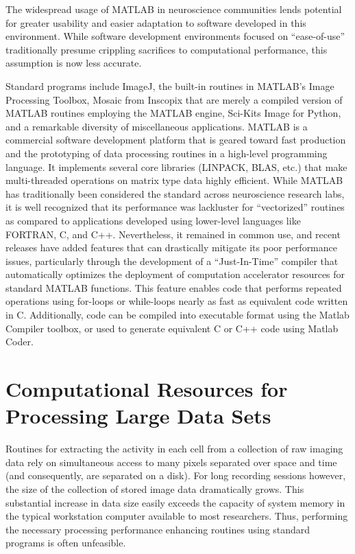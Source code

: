 \documentclass[
  12pt,
  lettersizepaper,
]{book}
\begin{document}
The widespread usage of MATLAB in neuroscience communities lends
potential for greater usability and easier adaptation to software
developed in this environment. While software development environments
focused on ``ease-of-use'' traditionally presume crippling sacrifices to
computational performance, this assumption is now less accurate.

Standard programs include ImageJ, the built-in routines in MATLAB's
Image Processing Toolbox, Mosaic from Inscopix that are merely a
compiled version of MATLAB routines employing the MATLAB engine,
Sci-Kits Image for Python, and a remarkable diversity of miscellaneous
applications. MATLAB is a commercial software development platform that
is geared toward fast production and the prototyping of data processing
routines in a high-level programming language. It implements several
core libraries (LINPACK, BLAS, etc.) that make multi-threaded operations
on matrix type data highly efficient. While MATLAB has traditionally
been considered the standard across neuroscience research labs, it is
well recognized that its performance was lackluster for ``vectorized''
routines as compared to applications developed using lower-level
languages like FORTRAN, C, and C++. Nevertheless, it remained in common
use, and recent releases have added features that can drastically
mitigate its poor performance issues, particularly through the
development of a ``Just-In-Time'' compiler that automatically optimizes
the deployment of computation accelerator resources for standard MATLAB
functions. This feature enables code that performs repeated operations
using for-loops or while-loops nearly as fast as equivalent code written
in C. Additionally, code can be compiled into executable format using
the Matlab Compiler toolbox, or used to generate equivalent C or C++
code using Matlab Coder.

\hypertarget{sec:computational-resources-for-processing-large-data-sets}{%
\section{Computational Resources for Processing Large Data
Sets}\label{sec:computational-resources-for-processing-large-data-sets}}

Routines for extracting the activity in each cell from a collection of
raw imaging data rely on simultaneous access to many pixels separated
over space and time (and consequently, are separated on a disk). For
long recording sessions however, the size of the collection of stored
image data dramatically grows. This substantial increase in data size
easily exceeds the capacity of system memory in the typical workstation
computer available to most researchers. Thus, performing the necessary
processing performance enhancing routines using standard programs is
often unfeasible.
\end{document}

